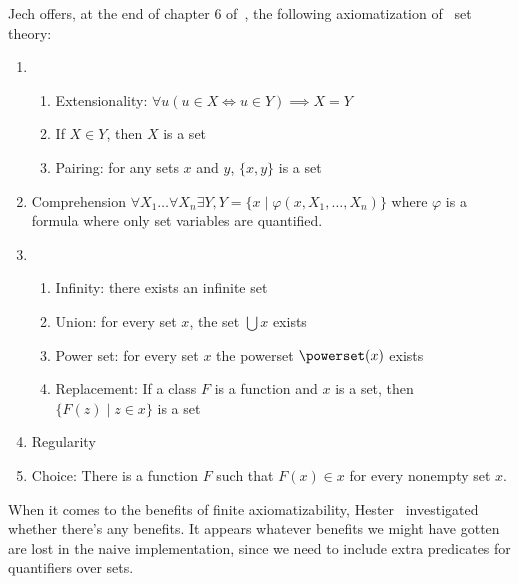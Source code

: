 \begin{node}\label{nbg-000D}
Jech offers, at the end of chapter 6 of~\cite{jech2003set},
the following axiomatization of \NBG\ set theory:
\begin{enumerate}
  \item \begin{enumerate}
  \item Extensionality: $\forall u(u\in X\iff u\in Y)\implies X=Y$
  \item If $X\in Y$, then $X$ is a set
  \item Pairing: for any sets $x$ and $y$, $\{x,y\}$ is a set
  \end{enumerate}
  \item Comprehension $\forall X_{1}\dots\forall X_{n}\exists Y, Y=\{x\mid\varphi(x,X_{1},\dots,X_{n})\}$
    where $\varphi$ is a formula where only set variables are quantified.
  \item \begin{enumerate}
  \item Infinity: there exists an infinite set
  \item Union: for every set $x$, the set $\bigcup x$ exists
  \item Power set: for every set $x$ the powerset $\powerset(x)$ exists
  \item Replacement: If a class $F$ is a function and $x$ is a set, then
    $\{F(z)\mid z\in x\}$ is a set
  \end{enumerate}
  \item Regularity
  \item Choice: There is a function $F$ such that $F(x)\in x$ for every
    nonempty set $x$.
\end{enumerate}
\end{node}

\begin{node}\label{nbg-000E}
When it comes to the benefits of finite axiomatizability,
Hester~\cite{hester2019automated} investigated whether there's any
benefits. It appears whatever benefits we might have gotten are lost in
the naive implementation, since we need to include extra predicates for
quantifiers over sets.
\end{node}
